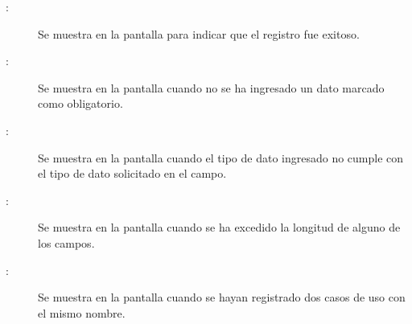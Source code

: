 	
\begin{description}
	\item[ :] Se muestra en la pantalla  para indicar que el registro fue exitoso.
	\item[ :] Se muestra en la pantalla  cuando no se ha ingresado un dato marcado como obligatorio.
	\item[ :] Se muestra en la pantalla  cuando el tipo de dato ingresado no cumple con el tipo de dato solicitado en el campo.
	\item[ :] Se muestra en la pantalla  cuando se ha excedido la longitud de alguno de los campos.
	\item[ :] Se muestra en la pantalla  cuando se hayan registrado dos casos de uso con el mismo nombre.
	
\end{description}
